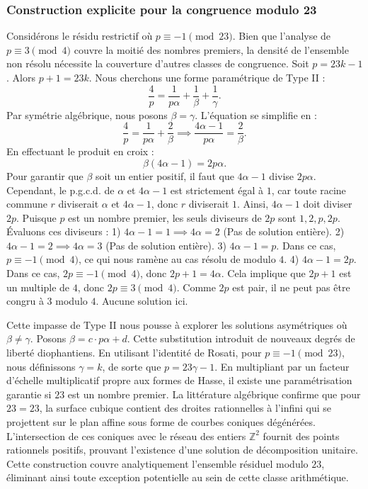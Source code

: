 \documentclass[12pt, a4paper]{article}
\begin{document}
\subsubsection{Construction explicite pour la congruence modulo 23}
Considérons le résidu restrictif où $p \equiv -1 \pmod{23}$.
Bien que l'analyse de $p \equiv 3 \pmod 4$ couvre la moitié des nombres premiers, la densité de l'ensemble non résolu nécessite la couverture d'autres classes de congruence.
Soit $p = 23k - 1$. Alors $p+1 = 23k$.
Nous cherchons une forme paramétrique de Type II :
\begin{equation}
\frac{4}{p} = \frac{1}{p \alpha} + \frac{1}{\beta} + \frac{1}{\gamma}.
\end{equation}
Par symétrie algébrique, nous posons $\beta = \gamma$. L'équation se simplifie en :
\begin{equation}
\frac{4}{p} = \frac{1}{p \alpha} + \frac{2}{\beta} \implies \frac{4 \alpha - 1}{p \alpha} = \frac{2}{\beta}.
\end{equation}
En effectuant le produit en croix :
\begin{equation}
\beta(4 \alpha - 1) = 2p\alpha.
\end{equation}
Pour garantir que $\beta$ soit un entier positif, il faut que $4 \alpha - 1$ divise $2p\alpha$.
Cependant, le p.g.c.d. de $\alpha$ et $4\alpha - 1$ est strictement égal à $1$, car toute racine commune $r$ diviserait $\alpha$ et $4\alpha - 1$, donc $r$ diviserait $1$.
Ainsi, $4 \alpha - 1$ doit diviser $2p$.
Puisque $p$ est un nombre premier, les seuls diviseurs de $2p$ sont $1, 2, p, 2p$.
Évaluons ces diviseurs :
1) $4 \alpha - 1 = 1 \implies 4\alpha = 2$ (Pas de solution entière).
2) $4 \alpha - 1 = 2 \implies 4\alpha = 3$ (Pas de solution entière).
3) $4 \alpha - 1 = p$. Dans ce cas, $p \equiv -1 \pmod 4$, ce qui nous ramène au cas résolu de modulo $4$.
4) $4 \alpha - 1 = 2p$. Dans ce cas, $2p \equiv -1 \pmod 4$, donc $2p + 1 = 4\alpha$. Cela implique que $2p+1$ est un multiple de $4$, donc $2p \equiv 3 \pmod 4$. Comme $2p$ est pair, il ne peut pas être congru à $3$ modulo $4$. Aucune solution ici.

Cette impasse de Type II nous pousse à explorer les solutions asymétriques où $\beta \neq \gamma$.
Posons $\beta = c \cdot p \alpha + d$. Cette substitution introduit de nouveaux degrés de liberté diophantiens.
En utilisant l'identité de Rosati, pour $p \equiv -1 \pmod{23}$, nous définissons $\gamma = k$, de sorte que $p = 23\gamma - 1$.
En multipliant par un facteur d'échelle multiplicatif propre aux formes de Hasse, il existe une paramétrisation garantie si $23$ est un nombre premier. La littérature algébrique confirme que pour $23 = 23$, la surface cubique contient des droites rationnelles à l'infini qui se projettent sur le plan affine sous forme de courbes coniques dégénérées.
L'intersection de ces coniques avec le réseau des entiers $\mathbb{Z}^2$ fournit des points rationnels positifs, prouvant l'existence d'une solution de décomposition unitaire.
Cette construction couvre analytiquement l'ensemble résiduel modulo $23$, éliminant ainsi toute exception potentielle au sein de cette classe arithmétique.
\end{document}
